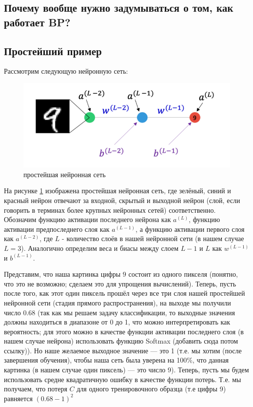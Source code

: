 \documentclass[a4paper, 10pt, openany]{book} %
\begin{document}
	\subsection{Почему вообще нужно задумываться о том, как работает BP?}
	
	\subsection{Простейший пример}
	
	Рассмотрим следующую нейронную сеть:
	
	\begin{figure}[h!]
		\centering
		\includegraphics[width=\linewidth]{pictures/backpropagation/1-1-1_network.png}
		\caption{простейшая нейронная сеть}
		\label{simplest_nn}
	\end{figure}
	
	На рисунке \ref{simplest_nn} изображена простейшая нейронная сеть, где зелёный, синий и красный нейрон отвечают за входной, скрытый и выходной нейрон (слой, если говорить в терминах более крупных нейронных сетей) соответственно. Обозначим функцию активации последнего нейрона как $a^{(L)}$, функцию активации предпоследнего слоя как $a^{(L-1)}$, а функцию активации первого слоя как $a^{(L-2)}$, где $L$ - количество слоёв в нашей нейронной сети (в нашем случае $L=3$). Аналогично определим веса и биасы между слоем $L-1$ и $L$ как $w^{(L-1)}$ и $b^{(L-1)}$.
	
	Представим, что наша картинка цифры $9$ состоит из одного пикселя (понятно, что это не возможно; сделаем это для упрощения вычислений). Теперь, пусть после того, как этот один пиксель прошёл через все три слоя нашей простейшей нейронной сети (стадия прямого распространения), на выходе мы получили число 0.68 (так как мы решаем задачу классификации, то выходные значения должны находиться в диапазоне от 0 до 1, что можно интерпретировать как вероятность; для этого можно в качестве функции активации последнего слоя (в нашем случае нейрона) использовать функцию Softmax (добавить сюда потом ссылку)). Но наше желаемое выходное значение --- это 1 (т.е. мы хотим (после завершения обучения), чтобы наша сеть была уверена на 100\%, что данная картинка (в нашем случае один пиксель) --- это число 9). Теперь, пусть мы будем использовать средне квадратичную ошибку в качестве функции потерь. Т.е. мы получаем, что потеря $C$ для одного тренировочного образца (т.е цифры 9) равняется $(0.68-1)^2$
	
\end{document}
